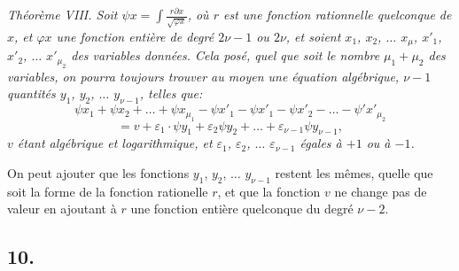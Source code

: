 \documentclass{article}
\begin{document}
\emph{Théorème VIII. Soit $\psi x = \displaystyle\int \frac{r\partial x}{\sqrt{\varphi x}}$, où $r$ est une fonction rationnelle quelconque de $x$, et $\varphi x$ une fonction entière de degré $2\nu-1$ ou $2\nu$, et soient $x_1$, $x_2$, $\ldots$ $x_\mu$, $x'_1$, $x'_2$, $\ldots$ $x'_{\mu_2}$ des variables données. Cela posé, quel que soit le nombre $\mu_1+\mu_2$ des variables, on pourra toujours trouver au moyen une équation algébrique, $\nu-1$ quantités $y_1$, $y_2$, $\ldots$ $y_{\nu-1}$, telles que:}
\[ \psi x_1 + \psi x_2 + \ldots + \psi x_{\mu_1} - \psi x'_1 - \psi x'_1 - \psi x'_2 - \ldots - \psi' x'_{\mu_2} \tag{39} \]
\[ = v + \varepsilon_1 \cdot \psi y_1 + \varepsilon_2\psi y_2 + \ldots + \varepsilon_{\nu-1}\psi y_{\nu-1}, \]
\emph{$v$ étant algébrique et logarithmique, et $\varepsilon_1$, $\varepsilon_2$, $\ldots$ $\varepsilon_{\nu-1}$ égales à $+1$ ou à $-1$.}

On peut ajouter que les fonctions $y_1$, $y_2$, $\ldots$ $y_{\nu-1}$ restent les mêmes, quelle que soit la forme de la fonction rationelle $r$, et que la fonction $v$ ne change pas de valeur en ajoutant à $r$ une fonction entière quelconque du degré $\nu-2$.

\subsection*{10.}
\end{document}
